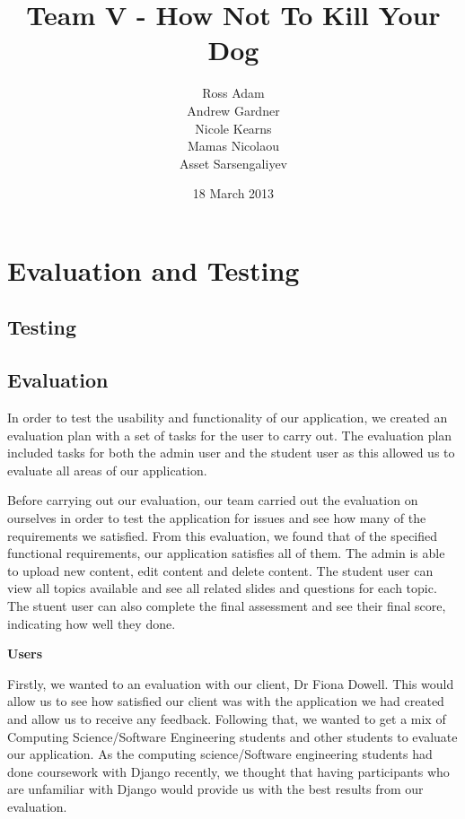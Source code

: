 \documentclass{l3proj}
\begin{document}
\title{Team V - How Not To Kill Your Dog}
\author{Ross Adam \\
        Andrew Gardner \\
        Nicole Kearns \\
        Mamas Nicolaou \\
        Asset Sarsengaliyev}
\date{18 March 2013}
\maketitle
\tableofcontents

\chapter{Evaluation and Testing}
\label{evaluation}

\section{Testing}

\section{Evaluation}

In order to test the usability and functionality of our application, we created an evaluation plan with a set of tasks for the user to carry out. The evaluation plan included tasks for both the admin user and the student user as this allowed us to evaluate all areas of our application.

Before carrying out our evaluation, our team carried out the evaluation on ourselves in order to test the application for issues and see how many of the requirements we satisfied. From this evaluation, we found that of the specified functional requirements, our application satisfies all of them. The admin is able to upload new content, edit content and delete content. The student user can view all topics available and see all related slides and questions for each topic. The stuent user can also complete the final assessment and see their final score, indicating how well they done.

\textbf{Users}

Firstly, we wanted to an evaluation with our client, Dr Fiona Dowell. This would allow us to see how satisfied our client was with the application we had created and allow us to receive any feedback. Following that, we wanted to get a mix of Computing Science/Software Engineering students and other students to evaluate our application. As the computing science/Software engineering students had done coursework with Django recently, we thought that having participants who are unfamiliar with Django would provide us with the best results from our evaluation.
\end{document}

